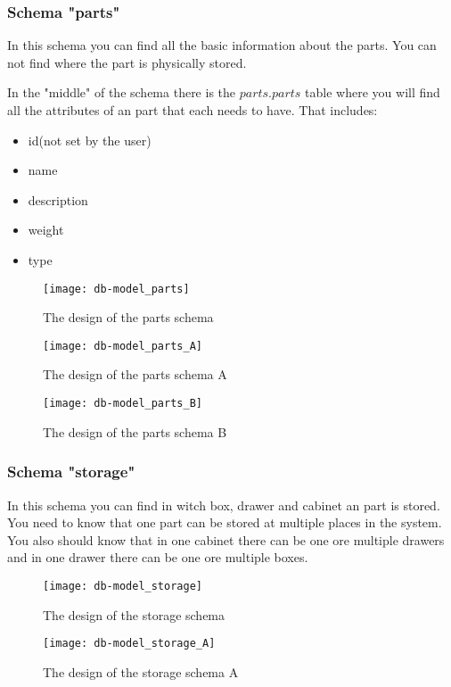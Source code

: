 \newpage
\subsubsection{Schema "parts"}
In this schema you can find all the basic information about the parts. You can not find where the part is physically stored.

In the "middle" of the schema there is the $parts.parts$ table where you will find all the attributes of an part that each needs to have. That includes:
\begin{itemize}
	\item id(not set by the user)
	\item name
	\item description
	\item weight
	\item type
\end{itemize}

\begin{figure}
	\texttt{[image: db-model\_parts]}
	\centering
	\caption{The design of the parts schema}
\end{figure}

\begin{figure}
	\texttt{[image: db-model\_parts\_A]}
	\centering
	\caption{The design of the parts schema A}
\end{figure}

\begin{figure}
\texttt{[image: db-model\_parts\_B]}
\centering
\caption{The design of the parts schema B}
\end{figure}

\newpage
\subsubsection{Schema "storage"}
In this schema you can find in witch box, drawer and cabinet an part is stored. You need to know that one part can be stored at multiple places in the system. You also should know that in one cabinet there can be one ore multiple drawers and in one drawer there can be one ore multiple boxes.

\begin{figure}
	\texttt{[image: db-model\_storage]}
	\centering
	\caption{The design of the storage schema}
\end{figure}

\begin{figure}
	\texttt{[image: db-model\_storage\_A]}
	\centering
	\caption{The design of the storage schema A}
\end{figure}

